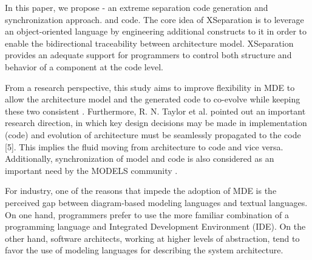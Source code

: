 In this paper, we propose  - an extreme separation code generation and synchronization approach. 
 and code.
The core idea of XSeparation is to leverage an object-oriented language by engineering additional constructs to it in order to enable the bidirectional traceability between architecture model.
XSeparation provides an adequate support for programmers to control both structure and behavior of a component at the code level. %



From a research perspective, this study aims to improve flexibility in MDE to allow the architecture model and the generated code to co-evolve while keeping these two consistent \cite{yu2012maintaining}. 
Furthermore, R. N. Taylor et al. \cite{Taylor:2007:SDA:1253532.1254721} pointed out an important research direction, in which key design decisions may be made in implementation (code) and evolution of architecture must be seamlessly propagated to the code [5]. 
This implies the fluid moving from architecture to code and vice versa. Additionally, synchronization of model and code is also considered as an important need by the MODELS community \cite{van2008challenges}.

For industry, one of the reasons that impede the adoption of MDE is the perceived gap between diagram-based modeling languages and textual languages. On one hand, programmers prefer to use the more familiar combination of a programming language and Integrated Development Environment (IDE). On the other hand, software architects, working at higher levels of abstraction, tend to favor the use of modeling languages for describing the system architecture.


